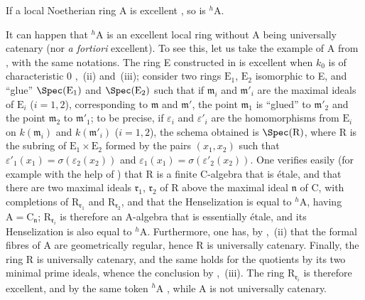\begin{corollary}[18.7.6]
\label{IV.18.7.6}
If a local Noetherian ring A is excellent , so is ${}^h\!\mathrm{A}$.
\end{corollary}

\begin{remark}[18.7.7]
\label{IV.18.7.7}
It can happen that ${}^h\!\mathrm{A}$ is an excellent local ring without A being universally catenary (nor \emph{a fortiori} excellent).
To see this, let us take the example of A from , with the same notations.
The ring E constructed in  is excellent when $k_0$ is of characteristic 0 ,~(ii) and~(iii);
consider two rings $\mathrm{E}_1$, $\mathrm{E}_2$ isomorphic to E, and ``glue'' $\Spec(\mathrm{E}_1)$ and $\Spec(\mathrm{E}_2)$ such that if $\mathfrak{m}_i$ and $\mathfrak{m}'_i$ are the maximal ideals of $\mathrm{E}_i$ ($i=1,2$), corresponding to $\mathfrak{m}$ and $\mathfrak{m}'$, the point $\mathfrak{m}_1$ is ``glued'' to $\mathfrak{m}'_2$ and the point $\mathfrak{m}_2$ to $\mathfrak{m}'_1$;
to be precise, if $\varepsilon_i$ and $\varepsilon'_i$ are the homomorphisms from $\mathrm{E}_i$ on $k(\mathfrak{m}_i)$ and $k(\mathfrak{m}'_i)$ ($i=1,2$), the schema obtained is $\Spec(\mathrm{R})$, where R is the subring of $\mathrm{E}_1\times\mathrm{E}_2$ formed by the pairs $(x_1,x_2)$ such that $\varepsilon'_1(x_1)=\sigma(\varepsilon_2(x_2))$ and $\varepsilon_1(x_1)=\sigma(\varepsilon'_2(x_2))$.
One verifies easily (for example with the help of ) that R is a finite C-algebra that is \'{e}tale, and that there are two maximal ideals $\mathfrak{r}_1$, $\mathfrak{r}_2$ of R above the maximal ideal $\mathfrak{n}$ of C, with completions of $\mathrm{R}_{\mathfrak{r}_1}$ and $\mathrm{R}_{\mathfrak{r}_2}$, and that the Henselization is equal to ${}^h\!\mathrm{A}$, having $\mathrm{A}=\mathrm{C}_\mathfrak{n}$;
$\mathrm{R}_{\mathfrak{r}_i}$ is therefore an A-algebra that is essentially \'{e}tale, and its Henselization is also equal to ${}^h\!\mathrm{A}$.
Furthermore, one has, by ,~(ii) that the formal fibres of A are geometrically regular, hence R is universally catenary.
Finally, the ring R is universally catenary, and the same holds for the quotients by its two minimal prime ideals, whence the conclusion by ,~(iii).
The ring $\mathrm{R}_{\mathfrak{r}_i}$ is therefore excellent, and by the same token ${}^h\!\mathrm{A}$ , while A is not universally catenary.
\end{remark}


